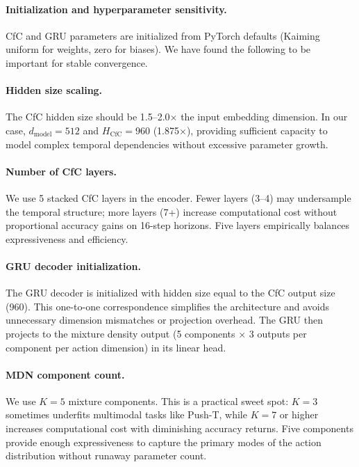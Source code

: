 \documentclass{article}
\begin{document}
\paragraph{Initialization and hyperparameter sensitivity.}
CfC and GRU parameters are initialized from PyTorch defaults (Kaiming uniform for weights, zero for biases). We have found the following to be important for stable convergence.

\paragraph{Hidden size scaling.}
The CfC hidden size should be 1.5--2.0$\times$ the input embedding dimension. In our case, $d_{\mathrm{model}}=512$ and $H_{\mathrm{CfC}}=960$ (1.875$\times$), providing sufficient capacity to model complex temporal dependencies without excessive parameter growth.

\paragraph{Number of CfC layers.}
We use 5 stacked CfC layers in the encoder. Fewer layers (3--4) may undersample the temporal structure; more layers (7+) increase computational cost without proportional accuracy gains on 16-step horizons. Five layers empirically balances expressiveness and efficiency.

\paragraph{GRU decoder initialization.}
The GRU decoder is initialized with hidden size equal to the CfC output size (960). This one-to-one correspondence simplifies the architecture and avoids unnecessary dimension mismatches or projection overhead. The GRU then projects to the mixture density output (5 components $\times$ 3 outputs per component per action dimension) in its linear head.

\paragraph{MDN component count.}
We use $K=5$ mixture components. This is a practical sweet spot: $K=3$ sometimes underfits multimodal tasks like Push-T, while $K=7$ or higher increases computational cost with diminishing accuracy returns. Five components provide enough expressiveness to capture the primary modes of the action distribution without runaway parameter count.
\end{document}
